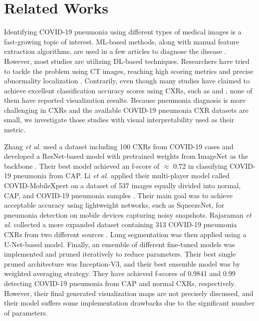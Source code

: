 \documentclass{article}
\begin{document}
\section{Related Works} \label{related_works}
Identifying COVID-19 pneumonia using different types of medical images is a fast-growing topic of interest. ML-based methods, along with manual feature extraction algorithms, are used in a few articles to diagnose the disease \cite{barstugan2020coronavirus, hassanien2020automatic, dey2020social, al2020ai, gomes2020ikonos}. However, most studies are utilizing DL-based techniques. Researchers have tried to tackle the problem using CT images, reaching high scoring metrics and precise abnormality localization \cite{shan+2020lung, gozes2020rapid}. Contrarily, even though many studies have claimed to achieve excellent classification accuracy scores using CXRs, such as \cite{pereira2020covid} and \cite{khan2020coronet}, none of them have reported visualization results. Because pneumonia diagnosis is more challenging in CXRs and the available COVID-19 pneumonia CXR datasets are small, we investigate those studies with visual interpretability used as their metric.

Zhang \textit{et al.} used a dataset including 100 CXRs from COVID-19 cases and developed a ResNet-based model with pretrained weights from ImageNet as the backbone \cite{zhang2020covid}. Their best model achieved an f-score of $\approx$ 0.72 in classifying COVID-19 pneumonia from CAP. Li \textit{et al.} applied their multi-player model called COVID-MobileXpert on a dataset of 537 images equally divided into normal, CAP, and COVID-19 pneumonia samples \cite{li2020covidmobilexpert}. Their main goal was to achieve acceptable accuracy using lightweight networks, such as SqueezeNet, for pneumonia detection on mobile devices capturing noisy snapshots. Rajaraman \textit{et al.} collected a more expanded dataset containing 313 COVID-19 pneumonia CXRs from two different sources \cite{rajaraman2020iteratively}. Lung segmentation was then applied using a U-Net-based model. Finally, an ensemble of different fine-tuned models was implemented and pruned iteratively to reduce parameters. Their best single pruned architecture was Inception-V3, and their best ensemble model was by weighted averaging strategy. They have achieved f-scores of 0.9841 and 0.99 detecting COVID-19 pneumonia from CAP and normal CXRs, respectively. However, their final generated visualization maps are not precisely discussed, and their model suffers some implementation drawbacks due to the significant number of parameters.
\end{document}
